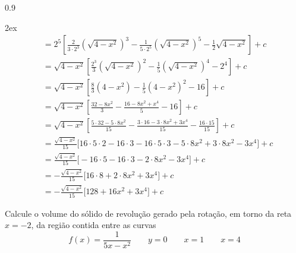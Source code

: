 \documentclass[a4paper,12pt,fleqn]{article}
\newenvironment{resposta}%
{\begingroup\color{blue}\small\begin{spacing}{0.9}}%
  {\end{spacing}\endgroup}
\begin{document}
\begin{resposta}
\begin{enumerate}[label=\alph*)]
\begin{spreadlines}{2ex}
\begin{align*}
        & = 2^5\left[
        \frac{2}{3\cdot 2^3}\left(\sqrt{4-x^2}\right)^3
        - \frac{1}{5\cdot 2^5}\left(\sqrt{4-x^2}\right)^5
        - \frac{1}{2} \sqrt{4-x^2}
        \right] + c \\
        & = \sqrt{4-x^2}
        \left[
        \frac{2^3}{3}\left(\sqrt{4-x^2}\right)^2
        - \frac{1}  {5}\left(\sqrt{4-x^2}\right)^4
        - 2^4
        \right] + c \\
        & = \sqrt{4-x^2}
        \left[
        \frac{8}{3}\left(4-x^2\right)
        - \frac{1}{5}\left(4-x^2\right)^2
        - 16
        \right] + c \\
        & = \sqrt{4-x^2}
        \left[
        \frac{32-8x^2}{3}
        - \frac{16-8x^2+x^4}{5}
        - 16
        \right] + c \\
        & = \sqrt{4-x^2}
        \left[
        \frac{5\cdot 32 - 5\cdot 8x^2}{15}
        -\frac{3\cdot 16 - 3\cdot 8x^2 + 3x^4}{15} - \frac{16\cdot 15}{15}
        \right] + c \\
        & = \frac{\sqrt{4-x^2}}{15}
        \Big[
        16\cdot 5\cdot 2 - 16 \cdot 3 - 16\cdot 5 \cdot 3
        - 5\cdot 8x^2 + 3\cdot 8x^2
        - 3x^4
        \Big] + c \\
        & = \frac{\sqrt{4-x^2}}{15}
        \Big[
        - 16\cdot 5 -16 \cdot 3
        - 2\cdot 8x^2
        - 3x^4
        \Big] + c \\
        & = -\frac{\sqrt{4-x^2}}{15}
        \Big[
        16\cdot 8
        + 2\cdot 8x^2
        + 3x^4
        \Big] + c \\
        & = -\frac{\sqrt{4-x^2}}{15}
        \Big[ 128 + 16x^2 + 3x^4 \Big] + c
      \end{align*}
    \end{spreadlines}
  \end{enumerate}
\end{resposta}

\vspace{\baselineskip}
Calcule o volume do sólido de revolução gerado pela rotação,
em torno da reta \(x=-2\), da região contida entre as curvas
\[
  f(x) = \frac{1}{5x-x^2} \qquad
  y = 0 \qquad
  x = 1 \qquad
  x = 4
\]
\end{document}
